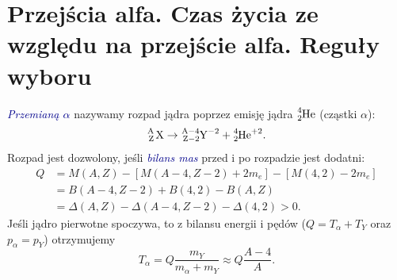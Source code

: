 \documentclass{article}
\let\oldemph\emph
\renewcommand{\emph}[1]{\textcolor{darkblue}{\oldemph{#1}}}
\begin{document}
\section{Przejścia alfa. Czas życia ze względu na przejście alfa. Reguły wyboru}
\label{sec:rozpad_alfa:26}

\emph{Przemianą $\alpha$} nazywamy rozpad jądra poprzez emisję jądra $\ce{^4_2He}$ (cząstki $\alpha$):
\begin{equation*}
    \ce{^A_Z X} \rightarrow \ce{^{A-4}_{Z-2}Y^{-2}} + \ce{^4_2He^{+2}}.
\end{equation*}
Rozpad jest dozwolony, jeśli \emph{bilans mas} przed i po rozpadzie jest dodatni:
\begin{align*}
    Q &= M(A,Z) - \left[ M(A-4, Z-2)+2m_e\right] - \left[ M(4,2)-2m_e \right]\\
    &=B(A-4, Z-2) + B(4,2) - B(A,Z)\\
    &=\Delta(A,Z) - \Delta(A-4,Z-2) - \Delta(4,2) > 0.
\end{align*}
Jeśli jądro pierwotne spoczywa, to z bilansu energii i pędów ($Q=T_{\alpha}+T_Y$ oraz $p_{\alpha}=p_Y$) otrzymujemy 
\begin{equation*}
    T_\alpha=Q\frac{m_Y}{m_{\alpha}+m_Y}\approx Q\frac{A-4}{A}.
\end{equation*}
\end{document}
